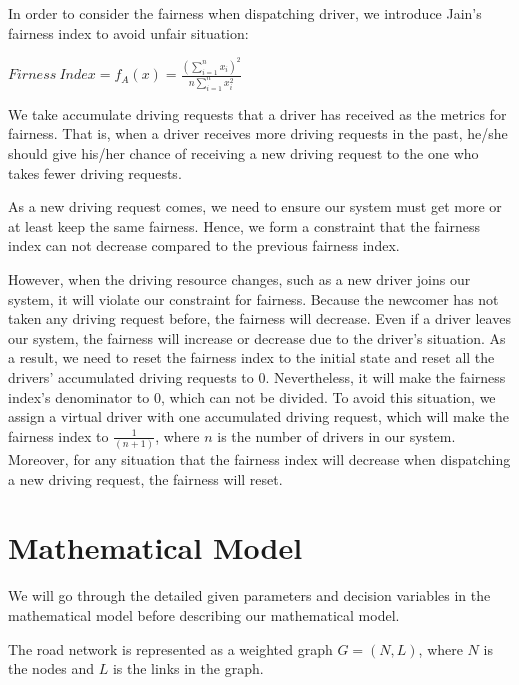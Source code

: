 In order to consider the fairness when dispatching driver, we introduce Jain's fairness index to avoid unfair situation:

$Firness\ Index = f_A(x) = \frac{\left(\sum\limits_{i=1}^{n} x_i\right)^2}{n \sum\limits_{i=1}^{n} x_i^2}$

We take accumulate driving requests that a driver has received as the metrics for fairness. That is, when a driver receives more driving requests in the past, he/she should give his/her chance of receiving a new driving request to the one who takes fewer driving requests.

As a new driving request comes, we need to ensure our system must get more or at least keep the same fairness. Hence, we form a constraint that the fairness index can not decrease compared to the previous fairness index.

However, when the driving resource changes, such as a new driver joins our system, it will violate our constraint for fairness. Because the newcomer has not taken any driving request before, the fairness will decrease. Even if a driver leaves our system, the fairness will increase or decrease due to the driver's situation. As a result, we need to reset the fairness index to the initial state and reset all the drivers' accumulated driving requests to 0. Nevertheless, it will make the fairness index's denominator to 0, which can not be divided. To avoid this situation, we assign a virtual driver with one accumulated driving request, which will make the fairness index to $\frac{1}{(n+1)}$, where $n$ is the number of drivers in our system. Moreover, for any situation that the fairness index will decrease when dispatching a new driving request, the fairness will reset.

\newpage

\section{Mathematical Model}

We will go through the detailed given parameters and decision variables in the mathematical model before describing our mathematical model.

The road network is represented as a weighted graph $G = (N, L)$, where $N$ is the nodes and $L$ is the links in the graph.

